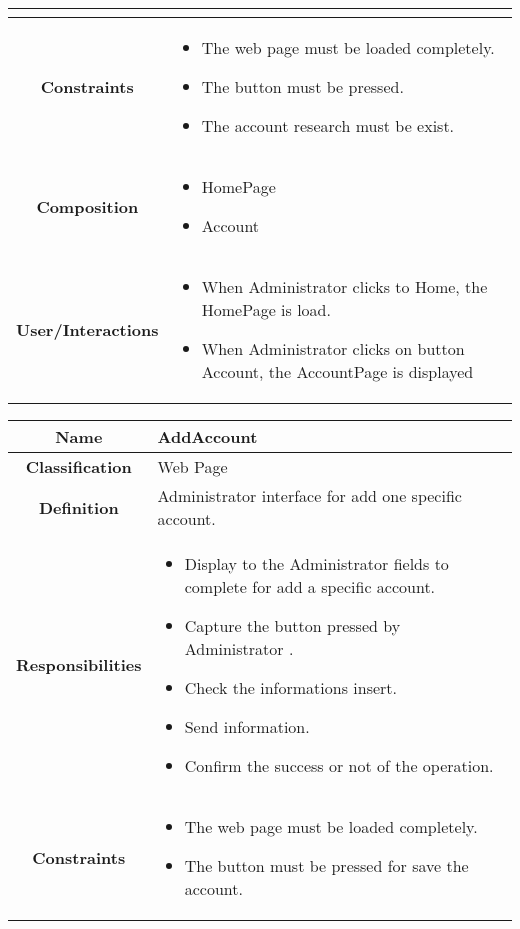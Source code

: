 \documentclass[11pt, a4paper,titlepage]{article}
\begin{document}
\begin{enumerate}
\begin{tabularx}{\textwidth}{| c | X |}
\begin{itemize}
	\end{itemize}
	\\
	\hline
	\textbf{Constraints} &
	\begin{itemize}
		\item  The web page must be loaded completely.
		\item The button must be pressed.
		\item The account research must be exist.
	\end{itemize}
	\\
	\hline
	\textbf{Composition} &
	\begin{itemize}
		\item HomePage
		\item Account
	\end{itemize}
	\\
	\hline
	\textbf{User/Interactions} &
	\begin{itemize}
		\item When Administrator clicks to Home, the HomePage is load.	
		\item When Administrator clicks on button Account, the AccountPage is displayed
	\end{itemize}
	\\
	\hline 
\end{tabularx}
\begin{tabularx}{\textwidth}{| c | X |}
	\hline
	\textbf{Name} &
	AddAccount
	\\
	\hline
	\textbf{Classification} &
	Web Page
	\\
	\hline
	\textbf{Definition} &
	Administrator interface for add one specific account.\\
	\hline
	\textbf{Responsibilities} &
	\begin{itemize}
		\item Display to the Administrator fields to complete for add a specific account.
		\item Capture the button pressed by Administrator .	
		\item Check the informations insert.
		\item Send information.
		\item Confirm the success or not of the operation.
	\end{itemize}
	\\
	\hline
	\textbf{Constraints} &
	\begin{itemize}
		\item The web page must be loaded completely.
		\item The button must be pressed for save the account.

\end{itemize}
\end{tabularx}
\end{enumerate}
\end{document}
